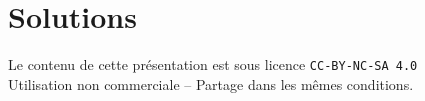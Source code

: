 \documentclass[xcolor={table,usenames,dvipsnames}]{article}
\begin{document}
\section{Solutions}
\hline 

		\printbibliography


	\centering
{\small Le contenu de cette présentation est sous licence \texttt{CC-BY-NC-SA 4.0}\\Utilisation non commerciale -- Partage dans les mêmes conditions.\\}
\href{https://creativecommons.org/licenses/by-nc-sa/4.0/deed.fr}{\ccbyncsa}
	
\end{document}
